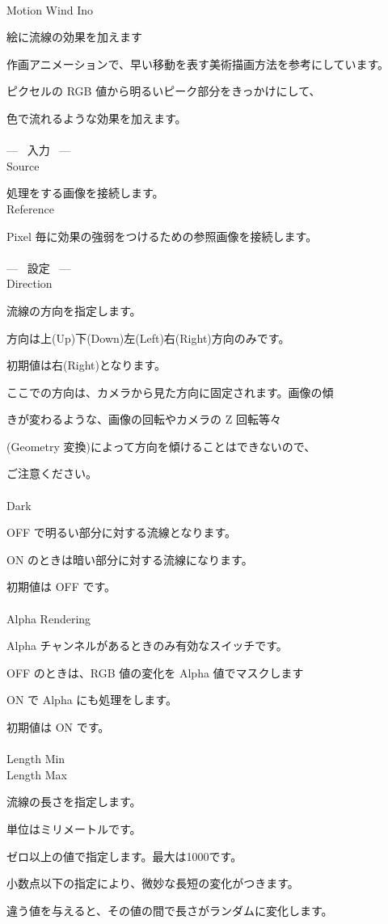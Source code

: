 \documentclass[a4paper,12pt]{article}
\begin{document}
\thispagestyle{empty}

\Large
\noindent \\
Motion Wind Ino\medskip
\par
\normalsize
絵に流線の効果を加えます\\
\par
作画アニメーションで、早い移動を表す美術描画方法を参考にしています。\par
ピクセルの RGB 値から明るいピーク部分をきっかけにして、\par
色で流れるような効果を加えます。\\
\\
--- \ 入力 \ ---\\
Source\par
処理をする画像を接続します。\\
Reference\par
Pixel 毎に効果の強弱をつけるための参照画像を接続します。\\
\\
--- \ 設定 \ ---\\
Direction\par
流線の方向を指定します。\par
方向は上(Up)下(Down)左(Left)右(Right)方向のみです。\par
初期値は右(Right)となります。\par
ここでの方向は、カメラから見た方向に固定されます。画像の傾\par
きが変わるような、画像の回転やカメラの Z 回転等々\par
(Geometry 変換)によって方向を傾けることはできないので、\par
ご注意ください。\\
\\
Dark\par
OFF で明るい部分に対する流線となります。\par
ON のときは暗い部分に対する流線になります。\par
初期値は OFF です。\\
\\
Alpha Rendering\par
Alpha チャンネルがあるときのみ有効なスイッチです。\par
OFF のときは、RGB 値の変化を Alpha 値でマスクします\par
ON で Alpha にも処理をします。\par
初期値は ON です。\\
\\
Length Min\\
Length Max\par
流線の長さを指定します。\par
単位はミリメートルです。\par
ゼロ以上の値で指定します。最大は1000です。\par
小数点以下の指定により、微妙な長短の変化がつきます。\par
違う値を与えると、その値の間で長さがランダムに変化します。
\end{document}
